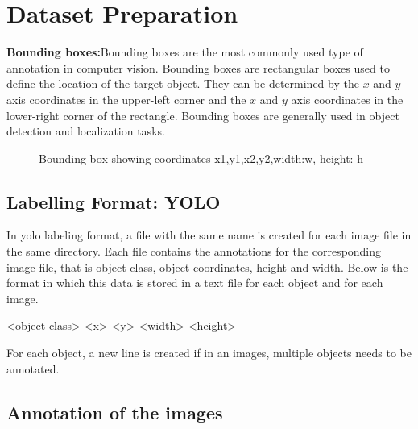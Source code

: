 %
%

\section{Dataset Preparation}

\textbf{Bounding boxes:}Bounding boxes are the most commonly used type of annotation in computer vision. Bounding boxes are rectangular boxes used to define the location of the target object. They can be determined by the $x$ and $y$ axis coordinates in the upper-left corner and the $x$ and $y$ axis coordinates in the lower-right corner of the rectangle. Bounding boxes are generally used in object detection and localization tasks.
\begin{figure}[H]
	\centering
	\caption{Bounding box showing coordinates x1,y1,x2,y2,width:w, height: h \cite{Kwon:2021}}
\end{figure} 

\subsection{Labelling Format: YOLO}

In \ac{yolo} labeling format, a  file with the same name is created for each image file in the same directory. Each  file contains the annotations for the corresponding image file, that is object class, object coordinates, height and width. Below is the format in which this data is stored in a text file for each object and for each image.

\bigskip

<object-class> <x> <y> <width> <height> 

\bigskip

For each object, a new line is created if in an images, multiple objects needs to be annotated. 

\subsection{Annotation of the images}

